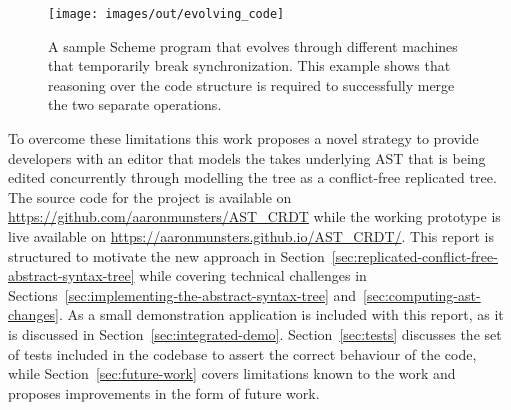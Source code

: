 \begin{figure}
    \centering
    \texttt{[image: images/out/evolving\_code]}
    \caption{
        A sample Scheme program that evolves through different machines that temporarily break synchronization.
        This example shows that reasoning over the code structure is required to successfully merge the two separate
        operations.
    }
    \label{fig:scheme-code-evolving}
\end{figure}

\begin{sloppypar}
    To overcome these limitations this work proposes a novel strategy to provide developers with an editor that models
    the takes underlying AST that is being edited concurrently through modelling the tree as a conflict-free replicated
    tree.
    The source code for the project is available on
    \href{https://github.com/aaronmunsters/AST\_CRDT}{https://github.com/aaronmunsters/AST\_CRDT} while the working
    prototype is live available on
    \href{https://aaronmunsters.github.io/AST\_CRDT/}{https://aaronmunsters.github.io/AST\_CRDT/}.
    This report is structured to motivate the new approach in
    Section~\ref{sec:replicated-conflict-free-abstract-syntax-tree} while covering technical challenges in
    Sections~\ref{sec:implementing-the-abstract-syntax-tree} and~\ref{sec:computing-ast-changes}.
    As a small demonstration application is included with this report, as it is discussed in
    Section~\ref{sec:integrated-demo}.
    Section~\ref{sec:tests} discusses the set of tests included in the codebase to assert the correct behaviour of the
    code, while Section~\ref{sec:future-work} covers limitations known to the work and proposes improvements in the form
    of future work.
\end{sloppypar}
